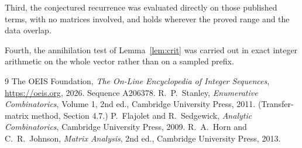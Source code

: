 \documentclass[11pt,a4paper]{article}
\theoremstyle{plain}
\theoremstyle{definition}
\begin{document}
Third, the conjectured recurrence was evaluated directly on those published terms, with no
matrices involved, and holds wherever the proved range and the data overlap.

Fourth, the annihilation test of Lemma~\ref{lem:crit} was carried out in exact integer
arithmetic on the whole vector rather than on a sampled prefix.

\begin{thebibliography}{9}
 The OEIS Foundation, \emph{The On-Line Encyclopedia of Integer
Sequences}, \url{https://oeis.org}, 2026. Sequence A206378.
 R.~P.~Stanley, \emph{Enumerative Combinatorics}, Volume 1, 2nd ed.,
Cambridge University Press, 2011. (Transfer-matrix method, Section 4.7.)
 P.~Flajolet and R.~Sedgewick, \emph{Analytic Combinatorics}, Cambridge
University Press, 2009.
 R.~A.~Horn and C.~R.~Johnson, \emph{Matrix Analysis}, 2nd ed., Cambridge
University Press, 2013.
\end{thebibliography}
\end{document}
